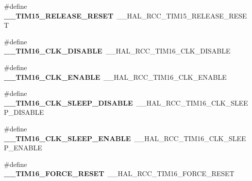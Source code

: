 \begin{DoxyCompactItemize}
\item 
\hypertarget{group___h_a_l___r_c_c___aliased_ga1b9c6bc76d9ee78a55710eb7773a2bbc}{\#define {\bfseries \-\_\-\-\_\-\-T\-I\-M15\-\_\-\-R\-E\-L\-E\-A\-S\-E\-\_\-\-R\-E\-S\-E\-T}~\-\_\-\-\_\-\-H\-A\-L\-\_\-\-R\-C\-C\-\_\-\-T\-I\-M15\-\_\-\-R\-E\-L\-E\-A\-S\-E\-\_\-\-R\-E\-S\-E\-T}\label{group___h_a_l___r_c_c___aliased_ga1b9c6bc76d9ee78a55710eb7773a2bbc}

\item 
\hypertarget{group___h_a_l___r_c_c___aliased_ga20a13035ec7902e5ca5fdf878cb51ec3}{\#define {\bfseries \-\_\-\-\_\-\-T\-I\-M16\-\_\-\-C\-L\-K\-\_\-\-D\-I\-S\-A\-B\-L\-E}~\-\_\-\-\_\-\-H\-A\-L\-\_\-\-R\-C\-C\-\_\-\-T\-I\-M16\-\_\-\-C\-L\-K\-\_\-\-D\-I\-S\-A\-B\-L\-E}\label{group___h_a_l___r_c_c___aliased_ga20a13035ec7902e5ca5fdf878cb51ec3}

\item 
\hypertarget{group___h_a_l___r_c_c___aliased_ga9dc682b745cf3b2bb955bcc5feb4bcd3}{\#define {\bfseries \-\_\-\-\_\-\-T\-I\-M16\-\_\-\-C\-L\-K\-\_\-\-E\-N\-A\-B\-L\-E}~\-\_\-\-\_\-\-H\-A\-L\-\_\-\-R\-C\-C\-\_\-\-T\-I\-M16\-\_\-\-C\-L\-K\-\_\-\-E\-N\-A\-B\-L\-E}\label{group___h_a_l___r_c_c___aliased_ga9dc682b745cf3b2bb955bcc5feb4bcd3}

\item 
\hypertarget{group___h_a_l___r_c_c___aliased_ga95b0b3e155fea0b19e66b5d38f4a3810}{\#define {\bfseries \-\_\-\-\_\-\-T\-I\-M16\-\_\-\-C\-L\-K\-\_\-\-S\-L\-E\-E\-P\-\_\-\-D\-I\-S\-A\-B\-L\-E}~\-\_\-\-\_\-\-H\-A\-L\-\_\-\-R\-C\-C\-\_\-\-T\-I\-M16\-\_\-\-C\-L\-K\-\_\-\-S\-L\-E\-E\-P\-\_\-\-D\-I\-S\-A\-B\-L\-E}\label{group___h_a_l___r_c_c___aliased_ga95b0b3e155fea0b19e66b5d38f4a3810}

\item 
\hypertarget{group___h_a_l___r_c_c___aliased_gade54c71fcbd16e23c401a6f219df9eaf}{\#define {\bfseries \-\_\-\-\_\-\-T\-I\-M16\-\_\-\-C\-L\-K\-\_\-\-S\-L\-E\-E\-P\-\_\-\-E\-N\-A\-B\-L\-E}~\-\_\-\-\_\-\-H\-A\-L\-\_\-\-R\-C\-C\-\_\-\-T\-I\-M16\-\_\-\-C\-L\-K\-\_\-\-S\-L\-E\-E\-P\-\_\-\-E\-N\-A\-B\-L\-E}\label{group___h_a_l___r_c_c___aliased_gade54c71fcbd16e23c401a6f219df9eaf}

\item 
\hypertarget{group___h_a_l___r_c_c___aliased_ga0e1e4dcad1f5857030a9a6aec4ba4750}{\#define {\bfseries \-\_\-\-\_\-\-T\-I\-M16\-\_\-\-F\-O\-R\-C\-E\-\_\-\-R\-E\-S\-E\-T}~\-\_\-\-\_\-\-H\-A\-L\-\_\-\-R\-C\-C\-\_\-\-T\-I\-M16\-\_\-\-F\-O\-R\-C\-E\-\_\-\-R\-E\-S\-E\-T}\label{group___h_a_l___r_c_c___aliased_ga0e1e4dcad1f5857030a9a6aec4ba4750}


\end{DoxyCompactItemize}
